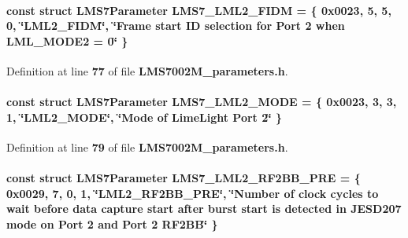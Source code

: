 \paragraph[{L\+M\+S7\+\_\+\+L\+M\+L2\+\_\+\+F\+I\+DM}]{\setlength{\rightskip}{0pt plus 5cm}const struct {\bf L\+M\+S7\+Parameter} L\+M\+S7\+\_\+\+L\+M\+L2\+\_\+\+F\+I\+DM = \{ 0x0023, 5, 5, 0, \char`\"{}\+L\+M\+L2\+\_\+\+F\+I\+D\+M\char`\"{}, \char`\"{}\+Frame start I\+D selection for Port 2 when L\+M\+L\+\_\+\+M\+O\+D\+E2 = 0\char`\"{} \}\hspace{0.3cm}{\ttfamily [static]}}\label{LMS7002M__parameters_8h_ae8f7d62631e1d4c3debc45d050ddd626}


Definition at line {\bf 77} of file {\bf L\+M\+S7002\+M\+\_\+parameters.\+h}.

\paragraph[{L\+M\+S7\+\_\+\+L\+M\+L2\+\_\+\+M\+O\+DE}]{\setlength{\rightskip}{0pt plus 5cm}const struct {\bf L\+M\+S7\+Parameter} L\+M\+S7\+\_\+\+L\+M\+L2\+\_\+\+M\+O\+DE = \{ 0x0023, 3, 3, 1, \char`\"{}\+L\+M\+L2\+\_\+\+M\+O\+D\+E\char`\"{}, \char`\"{}\+Mode of Lime\+Light Port 2\char`\"{} \}\hspace{0.3cm}{\ttfamily [static]}}\label{LMS7002M__parameters_8h_a9eebbbf34b2e74dd5980722345dedb62}


Definition at line {\bf 79} of file {\bf L\+M\+S7002\+M\+\_\+parameters.\+h}.

\paragraph[{L\+M\+S7\+\_\+\+L\+M\+L2\+\_\+\+R\+F2\+B\+B\+\_\+\+P\+RE}]{\setlength{\rightskip}{0pt plus 5cm}const struct {\bf L\+M\+S7\+Parameter} L\+M\+S7\+\_\+\+L\+M\+L2\+\_\+\+R\+F2\+B\+B\+\_\+\+P\+RE = \{ 0x0029, 7, 0, 1, \char`\"{}\+L\+M\+L2\+\_\+\+R\+F2\+B\+B\+\_\+\+P\+R\+E\char`\"{}, \char`\"{}\+Number of clock cycles to wait before data capture start after burst start is detected in J\+E\+S\+D207 mode on Port 2 and Port 2 R\+F2\+B\+B\char`\"{} \}\hspace{0.3cm}{\ttfamily [static]}}\label{LMS7002M__parameters_8h_a02098232326bbba96e4f2454d139ecd2}


